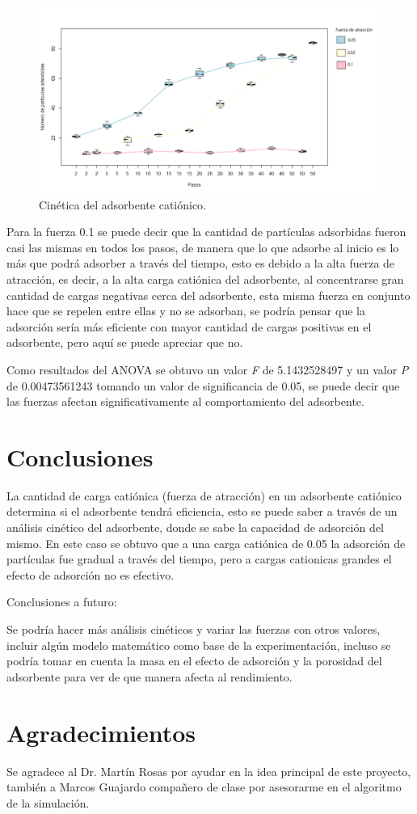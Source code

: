 \documentclass[12pt, letterpaper] {article}
\begin{document}
\begin{figure}[htb]
\centering
\includegraphics[width=1\textwidth]{Rplotcine.PNG}
\caption{Cinética del adsorbente catiónico. }
\label{fig2}
\end{figure}
 Para la fuerza 0.1 se puede decir que la cantidad de partículas adsorbidas fueron casi las mismas en todos los pasos, de manera que lo que adsorbe al inicio es lo más que podrá adsorber a través del tiempo, esto es debido a la alta fuerza de atracción, es decir, a la alta carga catiónica del adsorbente, al concentrarse gran cantidad de cargas negativas cerca del adsorbente, esta misma fuerza en conjunto hace que se repelen entre ellas y no se adsorban, se podría pensar que la adsorción sería más eficiente con mayor cantidad de cargas positivas en el adsorbente, pero aquí se puede apreciar que no.

Como resultados del ANOVA se obtuvo un valor \textit{F} de 5.1432528497 y un valor \textit{P} de 0.00473561243 tomando un valor de significancia de 0.05, se puede decir que las fuerzas afectan significativamente al comportamiento del adsorbente.


\section{Conclusiones}
La cantidad de carga catiónica (fuerza de atracción) en un adsorbente catiónico determina si el adsorbente tendrá eficiencia, esto se puede saber a través de un análisis cinético del adsorbente, donde se sabe la capacidad de adsorción del mismo. En este caso se obtuvo que a una carga catiónica de 0.05 la adsorción de partículas fue gradual a través del tiempo, pero a cargas cationicas grandes el efecto de adsorción no es efectivo.

Conclusiones a futuro:\par
Se podría hacer más análisis cinéticos y variar las fuerzas con otros valores, incluir algún modelo matemático como base de la experimentación, incluso se podría tomar en cuenta la masa en el efecto de adsorción y la porosidad del adsorbente para ver de que manera afecta al rendimiento.
  
\section{Agradecimientos}
Se agradece al Dr. Martín Rosas por ayudar en la idea principal de este proyecto, también a Marcos Guajardo compañero de clase por asesorarme en el algoritmo de la simulación.




\end{document}
